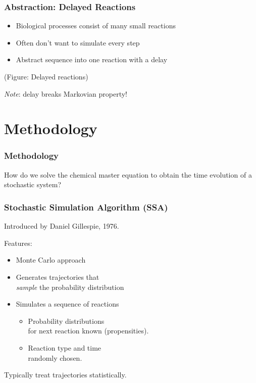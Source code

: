 \documentclass[xcolor={usenames,dvipsnames,svgnames}]{beamer}
\begin{document}
\begin{frame}
    \frametitle{Abstraction: Delayed Reactions}
    \begin{itemize}
        \item Biological processes consist of many small reactions
        \item Often don't want to simulate every step
        \item Abstract sequence into one reaction with a delay
    \end{itemize}
    (Figure: Delayed reactions)
    \pause

    \emph{Note}: delay breaks Markovian property!
\end{frame}


\section{Methodology} %
\label{sec:methodology}

\begin{frame}
    \frametitle{Methodology}
    How do we solve the chemical master equation to obtain the time evolution of a stochastic system?
\end{frame}

\begin{frame}
    \frametitle{Stochastic Simulation Algorithm (SSA)}
    Introduced by Daniel Gillespie, 1976.

    Features:
    \begin{itemize}
        \item Monte Carlo approach
        \item Generates trajectories that\\
            \emph{sample} the probability distribution
        \item Simulates a sequence of reactions
        \begin{itemize}
            \item Probability distributions\\
                for next reaction known (propensities).
            \item Reaction type and time\\
                randomly chosen.
        \end{itemize}
    \end{itemize}
    Typically treat trajectories statistically.
\end{frame}
\end{document}
